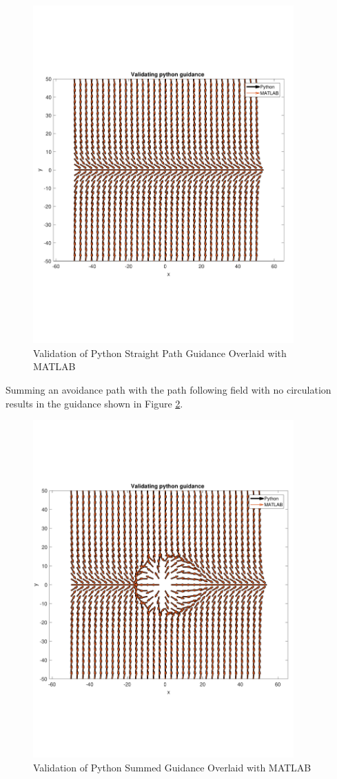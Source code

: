 \documentclass[numbered,pdftex]{ohio-etd}
\begin{document}
\begin{figure}[H]
	\centering
	\includegraphics[trim=0 150 0 150,clip,width=10cm]{PaperFigures/Methods/resultsPython/PathConfirm}
	\caption{Validation of Python Straight Path Guidance Overlaid with MATLAB}
	\label{fig:valPythonStraightPath}
\end{figure}



Summing an avoidance path with the path following field with no circulation results in the guidance shown in Figure \ref{fig:valPythonSummed}.



\begin{figure}[H]
	\centering
	\includegraphics[trim=0 140 0 140,clip,width=10cm]{PaperFigures/Methods/resultsPython/summedFields}
	\caption{Validation of Python Summed Guidance Overlaid with MATLAB}
	\label{fig:valPythonSummed}
\end{figure}
\end{document}
